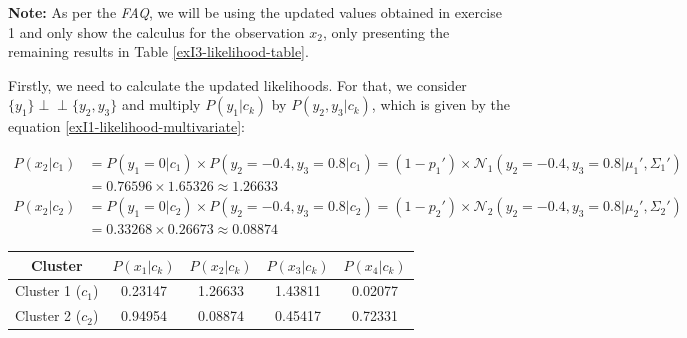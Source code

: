 \documentclass[12pt]{article}
\newcommand{\ind}{\perp\!\!\!\perp}
\begin{document}
\begin{enumerate}[leftmargin=\labelsep]
          \vskip 0.3cm
          \textbf{Note:} As per the \textit{FAQ}, we will be using the updated values obtained in exercise 1 and only show the calculus for the
          observation $x_2$, only presenting the remaining results in Table \ref{exI3-likelihood-table}.

          Firstly, we need to calculate the updated likelihoods. For that, we consider $\{y_1\} \ind \{y_2, y_3\}$ and multiply $P(y_1|c_k)$ by $P(y_2,y_3|c_k)$,
          which is given by the equation \eqref{exI1-likelihood-multivariate}:

          \vskip -0.4cm
          \begingroup
          \addtolength{\jot}{0.5em}
          \begin{align*}
              P(x_2 | c_1) & = P(y_1 = 0 | c_1) \times P(y_2 = -0.4, y_3 = 0.8 | c_1)
                             = (1 - p_1') \times \mathcal{N}_1(y_2 = -0.4, y_3 = 0.8 | \mu_1', \Sigma_1') \\
                           & = 0.76596 \times 1.65326 \approx 1.26633 \\
              P(x_2 | c_2) & = P(y_1 = 0 | c_2) \times P(y_2 = -0.4, y_3 = 0.8 | c_2)
                             = (1 - p_2') \times \mathcal{N}_2(y_2 = -0.4, y_3 = 0.8 | \mu_2', \Sigma_2') \\
                           & = 0.33268 \times 0.26673 \approx 0.08874
          \end{align*}
          \endgroup

          \vskip 0.2cm
          \begin{center}
            \captionsetup{type=table}
            \begin{tabular}{c|cccc}
                Cluster & $P(x_1 | c_k)$ & $P(x_2 | c_k)$& $P(x_3 | c_k)$ & $P(x_4 | c_k)$ \\
                \hline
                \colorbox{bmint}{Cluster 1} ($c_1$)                                        &
                0.23147                                                                    &
                1.26633                                                                    &
                1.43811                                                                    &
                0.02077                                                                    \\
                \colorbox{byellow}{Cluster 2} ($c_2$)                                      &
                0.94954                                                                    &
                0.08874                                                                    &
                0.45417                                                                    &
                0.72331                                                                    \\
            \end{tabular}
            \label{exI3-likelihood-table}
          \end{center}


\end{enumerate}
\end{document}
